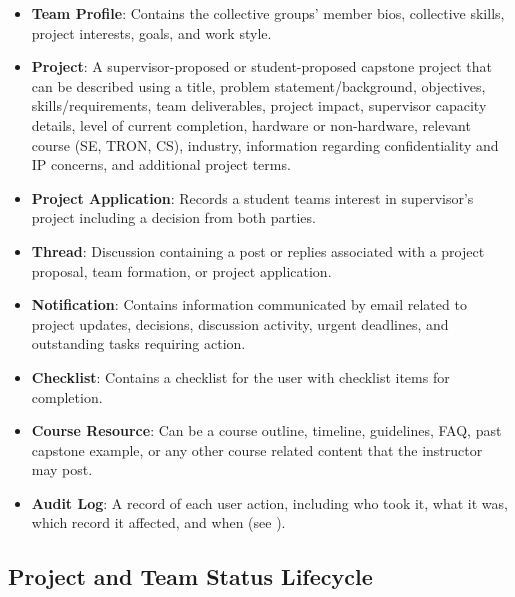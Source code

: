 \documentclass[12pt]{article}
\newcommand{\descriptiveid}[1]{\texttt{\detokenize{#1}}}
\newcommand{\idref}[1]{\hyperref[#1]{\descriptiveid{#1}}}
\newcommand{\nfrref}[1]{\idref{#1}}
\begin{document}
\begin{itemize}
    \item \textbf{Team Profile}: Contains the collective groups' member bios, collective skills, 
    project interests, goals, and work style.
    \item \textbf{Project}: A supervisor-proposed or student-proposed capstone project that can be 
    described using a title, problem statement/background, objectives, skills/requirements, team 
    deliverables, project impact, supervisor capacity details, level of current completion, hardware or non-hardware, relevant course
    (SE, TRON, CS), industry, information regarding confidentiality and IP concerns, and additional project terms. 
    \item \textbf{Project Application}: Records a student teams interest in supervisor's project including
    a decision from both parties.
    \item \textbf{Thread}: Discussion containing a post or replies associated with a project proposal, team formation,
    or project application.
    \item \textbf{Notification}: Contains information communicated by email related to project updates,
    decisions, discussion activity, urgent deadlines, and outstanding tasks requiring action. 
    \item \textbf{Checklist}: Contains a checklist for the user with checklist items for completion.
    \item \textbf{Course Resource}: Can be a course outline, timeline, guidelines, FAQ, past capstone
    example, or any other course related content that the instructor may post.
    \item \textbf{Audit Log}: A record of each user action, including who took it, what it was, which record it affected, and when (see \nfrref{NFR_AuditLog}).
  \end{itemize}

  \subsection{Project and Team Status Lifecycle}\label{sec:lifecycle}
\end{document}
